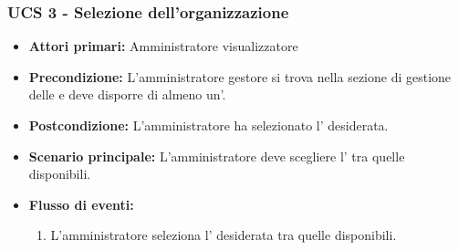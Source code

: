 \subsubsection{UCS 3 - Selezione dell'organizzazione}%
\begin{itemize}
    \item \textbf{Attori primari:} Amministratore visualizzatore
    \item \textbf{Precondizione:} L'amministratore gestore si trova nella sezione di gestione delle  e deve disporre di almeno un'.
    \item \textbf{Postcondizione:} L'amministratore ha selezionato l' desiderata.
    \item \textbf{Scenario principale:} L'amministratore deve scegliere l' tra quelle disponibili.
    \item \textbf{Flusso di eventi:}
    \begin{enumerate}
        \item L'amministratore seleziona l' desiderata tra quelle disponibili.
    \end{enumerate}
\end{itemize}